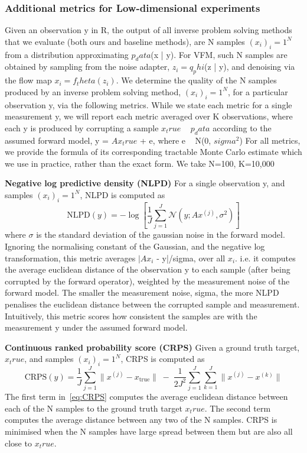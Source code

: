 \documentclass[12pt,a4paper]{report}
\begin{document}
\subsubsection{Additional metrics for Low-dimensional experiments}
Given an observation y in R, the output of all inverse problem solving methods that we evaluate (both ours and baseline methods), are N samples $(x_i)_i=1^N$ from a distribution approximating $p_data$(x | y).
For VFM, such N samples are obtained by sampling from the noise adapter, $z_i = q_phi$(z | y), and denoising via the flow map $x_i = f_theta(z_i)$. 
We determine the quality of the N samples produced by an inverse problem solving method, $(x_i)_i=1^N$, for a particular observation y, via the following metrics. 
While we state each metric for a single measurement y, we will report each metric averaged over K observations, where each y is produced by corrupting a sample $x_true$ ~ $p_data$ according to the assumed forward model, y = $Ax_true$ + e, where e ~ N(0, $sigma^2$)
For all metrics, we provide the formula of its corresponding tractable Monte Carlo estimate which we use in practice, rather than the exact form. 
We take N=100, K=10,000

\textbf{Negative log predictive density (NLPD)}
For a single observation y, and samples $(x_i)_i=1^N$, NLPD is computed as 
\begin{equation}
\label{eq:NLPD}
    \text{NLPD}(y) = -\log \left[ \frac{1}{J} \sum_{j=1}^{J} \mathcal{N}(y; A x^{(j)}, \sigma^2) \right]
\end{equation}
where $\sigma$ is the standard deviation of the gaussian noise in the forward model.
Ignoring the normalising constant of the Gaussian, and the negative log transformation, this metric averages $|Ax_i$ - y|/sigma,  over all $x_i$. 
i.e. it computes the average euclidean distance of the observation y to each sample (after being corrupted by the forward operator), weighted by the measurement noise of the forward model. 
The smaller the measurement noise, sigma, the more NLPD penalises the euclidean distance between the corrupted sample and measurement.
Intuitively, this metric scores how consistent the samples are with the measurement y under the assumed forward model. 

\textbf{Continuous ranked probability score (CRPS)}
Given a ground truth target, $x_true$, and samples $(x_i)_i=1^N$, CRPS is computed as 
\begin{equation}
\label{eq:CRPS}
    \text{CRPS}(y) = \frac{1}{J}\sum_{j=1}^{J} \big\| x^{(j)} - x_{\text{true}} \big\|
    \;-\; \frac{1}{2J^2}\sum_{j=1}^{J}\sum_{k=1}^{J} \big\| x^{(j)} - x^{(k)} \big\|
\end{equation}
The first term in~\ref{eq:CRPS} computes the average euclidean distance between each of the N samples to the ground truth target $x_true$. 
The second term computes the average distance between any two of the N samples. 
CRPS is minimised when the N samples have large spread between them but are also all close to $x_true$. 
\end{document}
